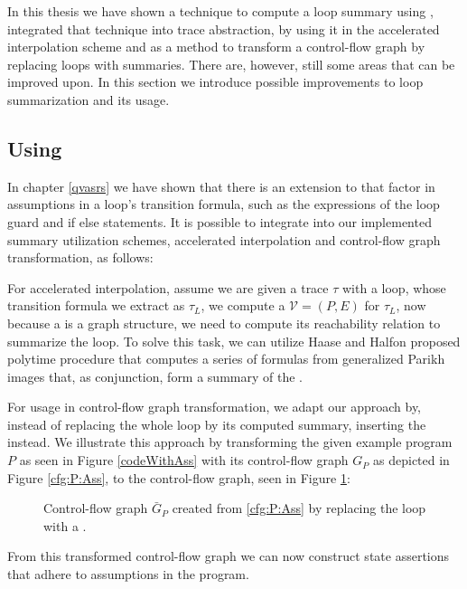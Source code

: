 
In this thesis we have shown a technique to compute a loop summary using \qvasr, integrated that technique into trace abstraction, by using it in the accelerated interpolation scheme and as a method to transform a control-flow graph by replacing loops with summaries. There are, however, still some areas that can be improved upon. In this section we introduce possible improvements to \qvasr loop summarization and its usage. \\ \par
\subsection{Using \qvasrs}
In chapter \ref{qvasrs} we have shown that there is an extension to \qvasr that factor in assumptions in a loop's transition formula, such as the expressions of the loop guard and if else statements. It is possible to integrate \qvasrs into our implemented summary utilization schemes, accelerated interpolation and control-flow graph transformation, as follows: \\ \par
For accelerated interpolation, assume we are given a trace $\tau$ with a loop, whose transition formula we extract as $\tau_L$, we compute a \qvasrs $\mathcal{V} = (P, E)$ for $\tau_L$, now because a \qvasrs is a graph structure, we need to compute its reachability relation to summarize the loop. To solve this task, we can utilize Haase and Halfon \cite{DBLP:conf/rp/HaaseH14} proposed polytime procedure that computes a series of formulas from generalized Parikh images that, as conjunction, form a summary of the \qvasrs. \\ \par
For \qvasrs usage in control-flow graph transformation, we adapt our approach by, instead of replacing the whole loop by its computed summary, inserting the \qvasrs instead. We illustrate this approach by transforming the given example program $P$ as seen in Figure \ref{codeWithAss} with its control-flow graph $G_P$ as depicted in Figure \ref{cfg:P:Ass}, to the control-flow graph, seen in Figure \ref{qvasrs_cfg}:
\begin{figure}[H]
	
	\caption{Control-flow graph $\bar{G}_P$ created from \ref{cfg:P:Ass} by replacing the loop with a \qvasrs.}
	\label{qvasrs_cfg}
\end{figure}
From this transformed control-flow graph we can now construct state assertions that adhere to assumptions in the program.
